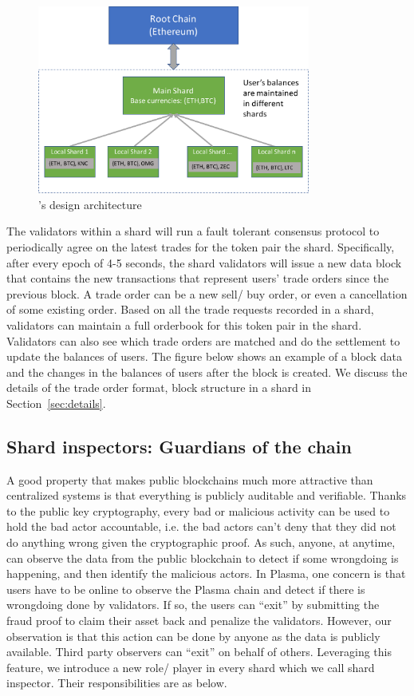 \begin{figure}[t]
  \centering
  \includegraphics[width=0.8\textwidth]{images//architecture2}
  \caption{\codename's design architecture}
  \label{architecture2}
\end{figure}


The validators within a shard will run a fault tolerant consensus protocol to periodically agree on the latest trades for the token pair the shard. Specifically, after every epoch of 4-5 seconds, the shard validators will issue a new data block that contains the new transactions that represent users’ trade orders since the previous block. A trade order can be a new sell/ buy order, or even a cancellation of some existing order. Based on all the trade requests recorded in a shard, validators can maintain a full orderbook for this token pair in the shard. Validators can also see which trade orders are matched and do the settlement to update the balances of users. The figure below shows an example of a block data and the changes in the balances of users after the block is created. We discuss the details of the trade order format, block structure in a shard in Section~\ref{sec:details}.

\subsection{Shard inspectors: Guardians of the chain}

A good property that makes public blockchains much more attractive than centralized systems is that everything is publicly auditable and verifiable. Thanks to the public key cryptography, every bad or malicious activity can be used to hold the bad actor accountable, i.e. the bad actors can’t deny that they did not do anything wrong given the cryptographic proof. As such, anyone, at anytime, can observe the data from the public blockchain to detect if some wrongdoing is happening, and then identify the malicious actors.
In Plasma, one concern is that users have to be online to observe the Plasma chain and detect if there is wrongdoing done by validators. If so, the users can “exit” by submitting the fraud proof to claim their asset back and penalize the validators. However, our observation is that this action can be done by anyone as the data is publicly available. Third party observers can “exit” on behalf of others. Leveraging this feature, we introduce a new role/ player in every shard which we call shard inspector. Their responsibilities are as below.

